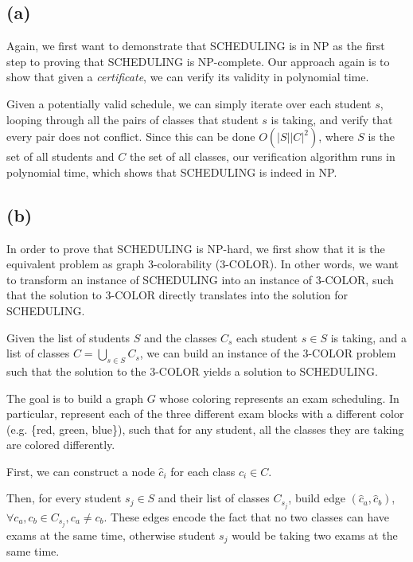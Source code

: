 \documentclass{6046}
\begin{document}
\subsection*{(a)}
Again, we first want to demonstrate that
SCHEDULING is in NP as the first step
to proving that SCHEDULING is NP-complete.
Our approach again is to show that given
a {\it certificate}, we can verify its
validity in polynomial time.

Given a potentially valid schedule,
we can simply iterate over each student
$s$, looping through all the pairs of
classes that student $s$ is taking,
and verify that every pair does not conflict.
Since this can be done $O(|S||C|^2)$, where
$S$ is the set of all students and $C$ the
set of all classes, our verification
algorithm runs in polynomial time,
which shows that SCHEDULING is indeed in NP.

\subsection*{(b)}
In order to prove that SCHEDULING is NP-hard, we
first show that it is the equivalent problem
as graph 3-colorability (3-COLOR). In other words,
we want to transform an instance of SCHEDULING
into an instance of 3-COLOR, such that the
solution to 3-COLOR directly translates
into the solution for SCHEDULING.

Given the list of students $S$ and the classes
$C_s$ each student $s \in S$ is taking, and a list of classes
$C = \bigcup_{s \in S} C_s$, we can build an instance of the 3-COLOR problem
such that the solution to the 3-COLOR yields a solution
to SCHEDULING.

The goal is to build a graph $G$
whose coloring represents an exam scheduling.
In particular, represent each of the three
different exam blocks with a different color
(e.g. \{red, green, blue\}), such that
for any student, all the classes they are taking
are colored differently.

First, we can construct a node $\hat{c}_i$ for
each class $c_i \in C$.

Then, for every student $s_j \in S$ and their list of
classes $C_{s_j}$, build edge $(\hat{c}_a, \hat{c}_b)$, $\forall
c_a, c_b \in C_{s_j}, c_a \neq c_b$. These edges
encode the fact that no two classes can have exams
at the same time, otherwise student $s_j$ would be taking
two exams at the same time.
\end{document}
